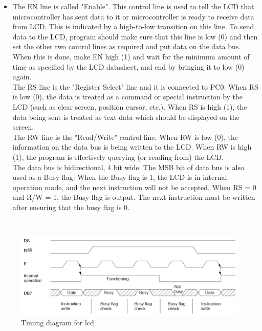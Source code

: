\documentclass[a4paper,12pt,oneside]{book}
\begin{document}
	\begin{itemize}
	\item {
		The EN line is called "Enable". This control line is used to tell the
		LCD that microcontroller has sent data to it or microcontroller is ready to receive data from
		LCD. This is indicated by a high-to-low transition on this line. To send data to the LCD, program
		should make sure that this line is low (0) and then set the other two control lines as required and
		put data on the data bus. When this is done, make EN high (1) and wait for the minimum amount
		of time as specified by the LCD datasheet, and end by bringing it to low (0) again.\\
		The RS line is the "Register Select" line and it is connected to PC0. When RS is low (0), the data
		is treated as a command or special instruction by the LCD (such as clear screen, position cursor,
		etc.). When RS is high (1), the data being sent is treated as text data which should be displayed
		on the screen.\\
		The RW line is the "Read/Write" control line. When RW is low (0),
		the information on the data bus is being written to the LCD. When RW is high (1), the program
		is effectively querying (or reading from) the LCD.\\
		The data bus is bidirectional, 4 bit wide.
		The MSB bit of data bus is also used as a Busy flag. When the Busy flag is 1, the LCD is
		in internal operation mode, and the next instruction will not be accepted. When RS = 0 and R/W
		= 1, the Busy flag is output. The next instruction must be written after ensuring that the
		busy flag is 0.
	}
	\end{itemize}

	\hfill\\
	\begin{figure}[h!]
		\caption{Timing diagram for lcd}
		\includegraphics[width=\textwidth]{./HardwareManual/lcd_timing_diagram.png}
	\end{figure}	
	\hfill\\
	
\end{document}
